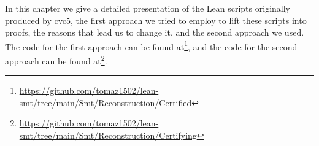In this chapter we give a detailed presentation of the Lean scripts originally produced by cvc5, the first approach we tried to employ to lift these scripts into proofs, the reasons that lead us to change it, and the second approach we used. The code for the first approach can be found at\footnote{\url{https://github.com/tomaz1502/lean-smt/tree/main/Smt/Reconstruction/Certified}}, and the code for the second approach can be found at\footnote{\url{https://github.com/tomaz1502/lean-smt/tree/main/Smt/Reconstruction/Certifying}}.
